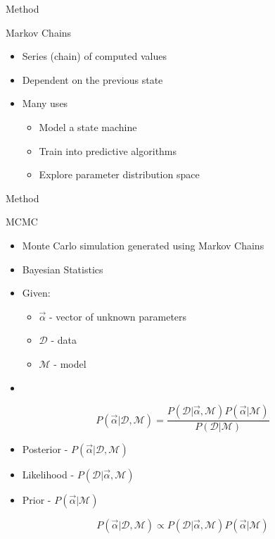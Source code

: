 \documentclass[t,10pt,fleqn]{beamer}
\begin{document}
\begin{frame}{Method}
	\vspace{-.3cm}
	\begin{block}{Markov Chains}
		\begin{itemize}
			\pause
			\item Series (chain) of computed values
			      \pause
			\item Dependent on the previous state
			      \pause
			\item Many uses
			      \pause
			      \begin{itemize}
				      \item Model a state machine
				            \pause
				      \item Train into predictive algorithms
				            \pause
				      \item Explore parameter distribution space
				            \pause
			      \end{itemize}
		\end{itemize}
	\end{block}
\end{frame}

\begin{frame}{Method}
	\vspace{-.3cm}
	\begin{block}{MCMC}
		\begin{itemize}
			\pause
			\item Monte Carlo simulation generated using Markov Chains
			      \pause
			\item Bayesian Statistics
			      \pause
			\item Given:
			      \begin{itemize}
				      \pause
				      \item $\vec{\alpha}$ - vector of unknown parameters
				            \pause
				      \item $\mathcal{D}$ - data
				            \pause
				      \item $\mathcal{M}$ - model
			      \end{itemize}
			      \pause
			\item
		\end{itemize}
		$$ P(\vec{\alpha} | \mathcal{D}, \mathcal{M}) = \frac{P(\mathcal{D} | \vec{\alpha}, \mathcal{M}) P(\vec{\alpha} | \mathcal{M})}{P(\mathcal{D} | \mathcal{M})}$$
		\pause
		\begin{itemize}
			\item Posterior - $P(\vec{\alpha} | \mathcal{D}, \mathcal{M})$
			\item Likelihood - $P(\mathcal{D} | \vec{\alpha}, \mathcal{M})$
			\item Prior - $P(\vec{\alpha} | \mathcal{M})$
		\end{itemize}
		$$ P(\vec{\alpha} | \mathcal{D}, \mathcal{M}) \propto P(\mathcal{D} | \vec{\alpha}, \mathcal{M}) P(\vec{\alpha} | \mathcal{M})$$

	\end{block}
	\pause
\end{frame}
\end{document}

